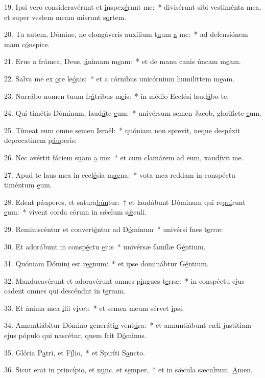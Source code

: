 19. Ipsi vero consíderavérunt et \uline{i}nspex\uline{é}runt me:~* divisérunt sibi vestiménta mea, et super vestem meam misrunt s\uline{o}rtem.\par 
20. Tu autem, Dómine, ne elongáveris auxílium t\uline{u}um \uline{a} me:~* ad defensiónem mam c\uline{ó}nspice.\par 
21. Erue a frámea, Deus, \uline{á}nimam m\uline{e}am:~* et de manu canis úncam m\uline{e}am.\par 
22. Salva me ex \uline{o}re le\uline{ó}nis:~* et a córnibus unicórnium humilittem m\uline{e}am.\par 
23. Narrábo nomen tuum fr\uline{á}tribus m\uline{e}is:~* in médio Ecclési laud\uline{á}bo te.\par 
24. Qui timétis Dóminum, laud\uline{á}te \uline{e}um:~* univérsum semen Jacob, glorificte \uline{e}um.\par 
25. Tímeat eum omne s\uline{e}men \uline{I}sraël:~* quóniam non sprevit, neque despéxit deprecatinem p\uline{áu}peris:\par 
26. Nec avértit fáciem s\uline{u}am \uline{a} me:~* et cum clamárem ad eum, xaud\uline{í}vit me.\par 
27. Apud te laus mea in eccl\uline{é}sia m\uline{a}gna:~* vota mea reddam in conspéctu timéntum \uline{e}um.\par 
28. Edent páuperes, et satura\uline{bún}tur:~† et laudábunt Dóminum qui re\uline{quí}runt \uline{e}um:~* vivent corda eórum in sǽclum s\uline{ǽ}culi.\par 
29. Reminiscéntur et convert\uline{é}ntur ad D\uline{ó}minum~* univérsi fnes t\uline{e}rræ:\par 
30. Et adorábunt in consp\uline{é}ctu \uline{e}jus~* univérsæ famílæ G\uline{é}ntium.\par 
31. Quóniam Dómin\uline{i} est r\uline{e}gnum:~* et ipse dominábtur G\uline{é}ntium.\par 
32. Manducavérunt et adoravérunt omnes p\uline{i}ngues t\uline{e}rræ:~* in conspéctu ejus cadent omnes qui descéndnt in t\uline{e}rram.\par 
33. Et ánima mea \uline{i}lli v\uline{i}vet:~* et semen meum sérvet \uline{i}psi.\par 
34. Annuntiábitur Dómino generáti\uline{o} vent\uline{ú}ra:~* et annuntiábunt cæli justítiam ejus pópulo qui nascétur, quem fcit D\uline{ó}minus.\par 
35. Glória P\uline{a}tri, et F\uline{í}lio,~* et Spiríti S\uline{a}ncto.\par 
36. Sicut erat in princípio, et n\uline{u}nc, et s\uline{e}mper,~* et in sǽcula sæculrum. \uline{A}men.\par 
